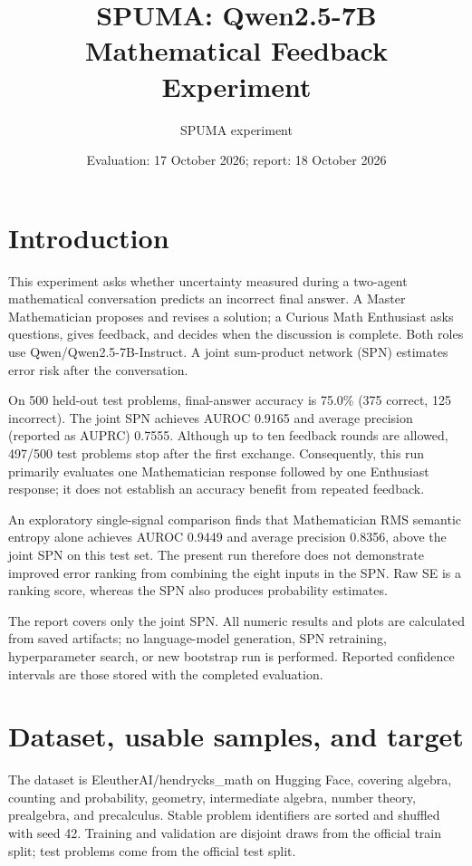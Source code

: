 \documentclass[11pt,a4paper]{article}
\begin{document}
\title{\textbf{SPUMA: Qwen2.5-7B Mathematical Feedback Experiment}}
\author{SPUMA experiment}
\date{Evaluation: 17 October 2026; report: 18 October 2026}
\maketitle
\section{Introduction}
This experiment asks whether uncertainty measured during a two-agent mathematical conversation predicts an incorrect final answer. A Master Mathematician proposes and revises a solution; a Curious Math Enthusiast asks questions, gives feedback, and decides when the discussion is complete. Both roles use Qwen/Qwen2.5-7B-Instruct. A joint sum-product network (SPN) estimates error risk after the conversation.

On 500 held-out test problems, final-answer accuracy is 75.0\% (375 correct, 125 incorrect). The joint SPN achieves AUROC 0.9165 and average precision (reported as AUPRC) 0.7555. Although up to ten feedback rounds are allowed, 497/500 test problems stop after the first exchange. Consequently, this run primarily evaluates one Mathematician response followed by one Enthusiast response; it does not establish an accuracy benefit from repeated feedback.

An exploratory single-signal comparison finds that Mathematician RMS semantic entropy alone achieves AUROC 0.9449 and average precision 0.8356, above the joint SPN on this test set. The present run therefore does not demonstrate improved error ranking from combining the eight inputs in the SPN. Raw SE is a ranking score, whereas the SPN also produces probability estimates.

The report covers only the joint SPN. All numeric results and plots are calculated from saved artifacts; no language-model generation, SPN retraining, hyperparameter search, or new bootstrap run is performed. Reported confidence intervals are those stored with the completed evaluation.

\section{Dataset, usable samples, and target}
The dataset is EleutherAI/hendrycks\_math on Hugging Face, covering algebra, counting and probability, geometry, intermediate algebra, number theory, prealgebra, and precalculus. Stable problem identifiers are sorted and shuffled with seed 42. Training and validation are disjoint draws from the official train split; test problems come from the official test split.
\end{document}

